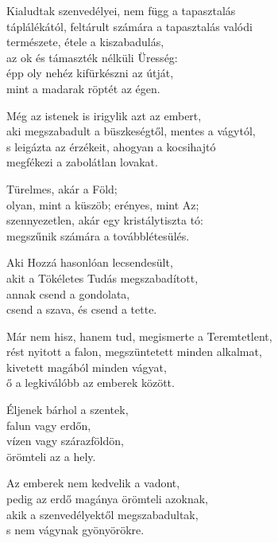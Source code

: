 \begin{dhpverse}

 Kialudtak szenvedélyei, nem függ a tapasztalás\\
táplálékától, feltárult számára a tapasztalás valódi\\
természete, étele a kiszabadulás,\\
az ok és támaszték nélküli Üresség:\\
épp oly nehéz kifürkészni az útját,\\
mint a madarak röptét az égen.

 Még az istenek is irigylik azt az embert,\\
aki megszabadult a büszkeségtől, mentes a vágytól,\\
s leigázta az érzékeit, ahogyan a kocsihajtó\\
megfékezi a zabolátlan lovakat.

 Türelmes, akár a Föld;\\
olyan, mint a küszöb; erényes, mint Az;\\
szennyezetlen, akár egy kristálytiszta tó:\\
megszűnik számára a továbblétesülés.

 Aki Hozzá hasonlóan lecsendesült,\\
akit a Tökéletes Tudás megszabadított,\\
annak csend a gondolata,\\
csend a szava, és csend a tette.

 Már nem hisz, hanem tud, megismerte a Teremtetlent,\\
rést nyitott a falon, megszüntetett minden alkalmat,\\
kivetett magából minden vágyat,\\
ő a legkiválóbb az emberek között.

\end{dhpverse}
\newpage
\begin{dhpverse}

 Éljenek bárhol a szentek,\\
falun vagy erdőn,\\
vízen vagy szárazföldön,\\
örömteli az a hely.

 Az emberek nem kedvelik a vadont,\\
pedig az erdő magánya örömteli azoknak,\\
akik a szenvedélyektől megszabadultak,\\
s nem vágynak gyönyörökre.

\end{dhpverse}

